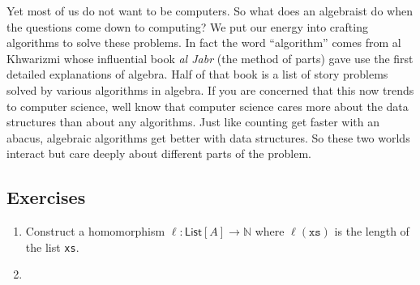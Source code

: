 Yet most of us do not want to be computers.  So what does an algebraist do 
when the questions come down to computing?  We put our energy into crafting 
algorithms to solve these problems.  In fact the word ``algorithm'' comes 
from al Khwarizmi whose influential book \emph{al Jabr} (the method of parts)
gave use the first detailed explanations of algebra.  Half of that book 
is a list of story problems solved by various algorithms in algebra.
If you are concerned that this now trends to computer science, well know that 
computer science cares more about the data structures than about any algorithms.
Just like counting get faster with an abacus, algebraic algorithms get better 
with data structures.  So these two worlds interact but care deeply about 
different parts of the problem.



\subsection{Exercises}

\begin{enumerate}

    \item Construct a homomorphism $\ell:\mathsf{List}[A]\to \mathbb{N}$ where 
    $\ell(\mathtt{xs})$ is the length of the list \texttt{xs}.

    \item 
\end{enumerate}
